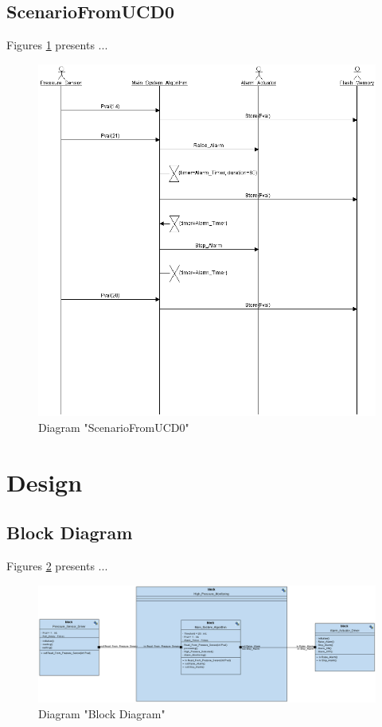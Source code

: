 \subsection{ScenarioFromUCD0}
Figures \ref{fig:ScenarioFromUCD0ScenarioFromUCD012} presents ...
\begin{figure}[htb]
\centering
\includegraphics[width=\textwidth]{img_1_2.png}
\caption{Diagram "ScenarioFromUCD0"}
\label{fig:ScenarioFromUCD0ScenarioFromUCD012}
\end{figure}

\section{Design}
\subsection{Block Diagram}
Figures \ref{fig:Block DiagramBlock Diagram20} presents ...
\begin{figure}[htb]
\centering
\includegraphics[width=\textwidth]{img_2_0.png}
\caption{Diagram "Block Diagram"}
\label{fig:Block DiagramBlock Diagram20}
\end{figure}

